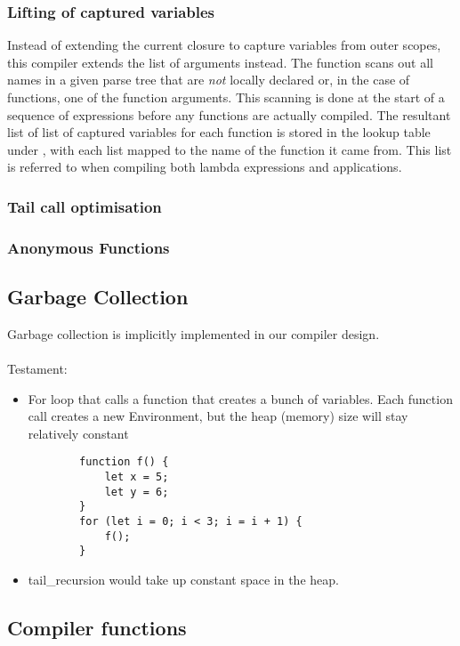 \subsubsection{Lifting of captured variables}
Instead of extending the current closure to capture variables from outer scopes, this compiler extends the list of arguments instead. The function  scans out all names in a given parse tree that are \textit{not} locally declared or, in the case of functions, one of the function arguments. This scanning is done at the start of a sequence of expressions before any functions are actually compiled. The resultant list of list of captured variables for each function is stored in the lookup table under , with each list mapped to the name of the function it came from. This list is referred to when compiling both lambda expressions and applications. 

\subsubsection{Tail call optimisation}

\subsubsection{Anonymous Functions}

\subsection{Garbage Collection}

Garbage collection is implicitly implemented in our compiler design.\\\\
Testament:
\begin{itemize}
	\item For loop that calls a function that creates a bunch of variables. Each function call creates a new Environment, but the heap (memory) size will stay relatively constant
	\begin{verbatim}
		function f() {
		    let x = 5;
		    let y = 6;
		}
		for (let i = 0; i < 3; i = i + 1) {
		    f();
		}
	\end{verbatim}
	\item tail\_recursion would take up constant space in the heap.
\end{itemize}

\subsection{Compiler functions}
